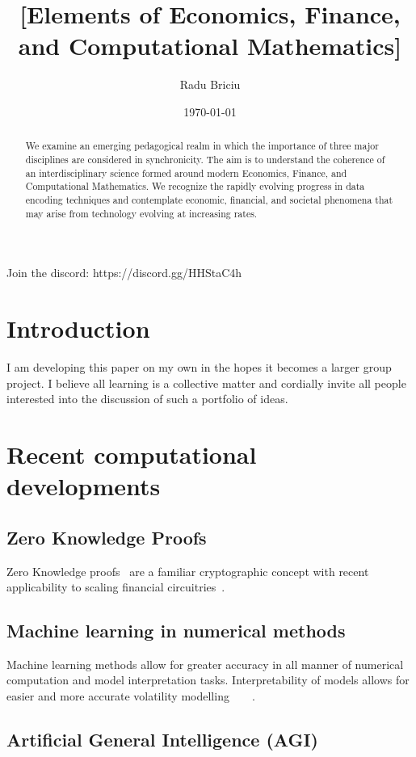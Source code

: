\documentclass[11pt]{article}
\title{[Elements of Economics, Finance, and Computational Mathematics]}
\date{\today}
\author{Radu Briciu}
\begin{document}
\nocite{*}
\maketitle
\newpage
\begin{abstract}
	\noindent
	We examine an emerging pedagogical realm in which the importance of three major disciplines are considered in synchronicity. The aim is to understand the coherence of an interdisciplinary science formed around modern Economics, Finance, and Computational Mathematics. We recognize the rapidly evolving progress in data encoding techniques and contemplate economic, financial, and societal phenomena that may arise from technology evolving at increasing rates.
\end{abstract}
\vspace{5em}
Join the discord: https://discord.gg/HHStaC4h

\newpage
\tableofcontents	
\newpage

\section{Introduction}
I am developing this paper on my own in the hopes it becomes a larger group project. I believe all learning is a collective matter and cordially invite all people interested into the discussion of such a portfolio of ideas.

\section{Recent computational developments}
\subsection{Zero Knowledge Proofs}
Zero Knowledge proofs~\cite{ernstberger_2024_do} are a familiar cryptographic concept with recent applicability to scaling financial circuitries~\cite{leethorp_2022_fnet}.
\subsection{Machine learning in numerical methods}
Machine learning methods allow for greater accuracy in all manner of numerical computation and model interpretation tasks. Interpretability of models allows for easier and more accurate volatility modelling~\cite{beck_2019_machine}~\cite{kirenz_2022_using}~\cite{parr_2021_partial}~\cite{yuan_2024_deep}.

\subsection{Artificial General Intelligence (AGI)}
\end{document}
